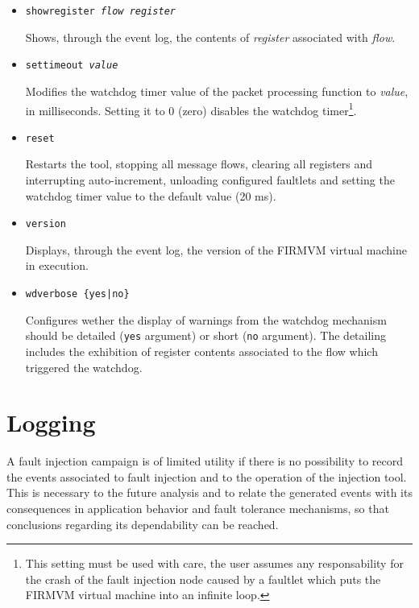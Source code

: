 \documentclass[11pt]{article}
\begin{document}
\begin{itemize}
\begin{itemize}
\item \texttt{showregister {\em flow} {\em register}}



Shows, through the event log, the contents of {\em register} associated with {\em flow}.


\item \texttt{settimeout {\em value}}

Modifies the watchdog timer value of the packet processing function to {\em value}, in milliseconds. Setting it to 0 (zero) disables the watchdog timer\footnote{This setting must be used with care, the user assumes any responsability for the crash of the fault injection node caused by a faultlet which puts the \textsf{FIRMVM} virtual machine into an infinite loop.}.

\item \texttt{reset}

Restarts the tool, stopping all message flows, clearing all registers and interrupting auto-increment, unloading configured faultlets and setting the watchdog timer value to the default value (20 ms).

\item \texttt{version}

Displays, through the event log, the version of the \textsf{FIRMVM} virtual machine in execution.

\item \texttt{wdverbose \{yes|no\}}

Configures wether the display of warnings from the watchdog mechanism should be detailed (\texttt{yes} argument) or short (\texttt{no} argument). The detailing includes the exhibition of register contents associated to the flow which triggered the watchdog.

\end{itemize}

\end{itemize}



\section{Logging}

A fault injection campaign is of limited utility if there is no possibility to record the events associated to fault injection and to the operation of the injection tool. This is necessary to the future analysis and to relate the generated events with its consequences in application behavior and fault tolerance mechanisms, so that conclusions regarding its dependability can be reached.
\end{document}
